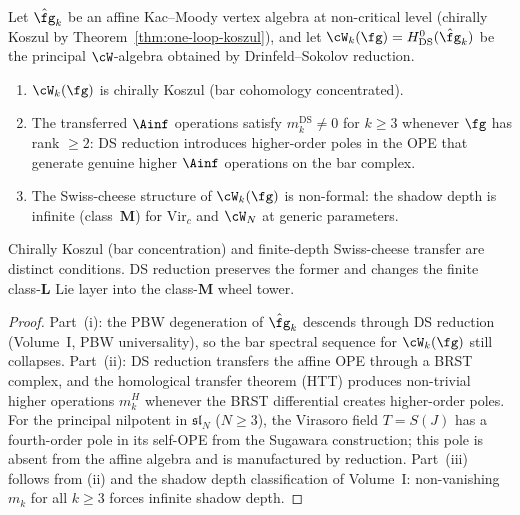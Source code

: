 \begin{theorem}
\label{thm:ds-koszul-obstruction}
Let\/ $\hat{\fg}_k$ be an affine Kac--Moody vertex algebra
at non-critical level \textup{(}chirally Koszul by
Theorem~\textup{\ref{thm:one-loop-koszul})}, and let\/
$\cW_k(\fg) = H^0_{\mathrm{DS}}(\hat{\fg}_k)$ be the
principal $\cW$-algebra obtained by Drinfeld--Sokolov
reduction.
\begin{enumerate}[label=\textup{(\roman*)}]
\item $\cW_k(\fg)$ is chirally Koszul
 \textup{(}bar cohomology concentrated\textup{)}.
\item The transferred $\Ainf$ operations satisfy
 $m_k^{\mathrm{DS}} \neq 0$ for $k \ge 3$ whenever
 $\fg$ has rank $\ge 2$: DS reduction introduces
 higher-order poles in the OPE that generate genuine
 higher $\Ainf$ operations on the bar complex.
\item The Swiss-cheese structure of\/ $\cW_k(\fg)$ is
 non-formal: the shadow depth is infinite
 \textup{(}class~$\mathbf{M}$\textup{)} for
 $\mathrm{Vir}_c$ and $\cW_N$ at generic parameters.
\end{enumerate}
Chirally Koszul \textup{(}bar concentration\textup{)}
and finite-depth Swiss-cheese transfer are distinct conditions. DS
reduction preserves the former and changes the finite class-$\mathbf L$
Lie layer into the class-$\mathbf M$ wheel tower.
\end{theorem}

\begin{proof}
Part~(i): the PBW degeneration of\/ $\hat{\fg}_k$
descends through DS reduction
(Volume~I, PBW universality), so the bar spectral
sequence for $\cW_k(\fg)$ still collapses.
Part~(ii): DS reduction transfers the affine OPE through
a BRST complex, and the homological transfer theorem
(HTT) produces non-trivial higher operations $m_k^H$
whenever the BRST differential creates higher-order
poles. For the principal nilpotent in $\mathfrak{sl}_N$
($N \ge 3$), the Virasoro field $T = S(J)$ has a
fourth-order pole in its self-OPE from the Sugawara
construction; this pole is absent from the affine algebra
and is manufactured by reduction.
Part~(iii) follows from (ii) and the shadow depth
classification of Volume~I: non-vanishing $m_k$ for all
$k \ge 3$ forces infinite shadow depth.
\end{proof}

